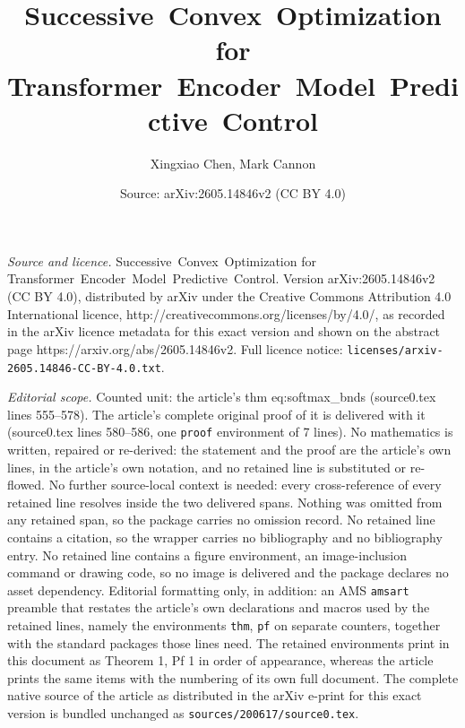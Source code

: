 \documentclass[10pt,a4paper]{amsart}
\title{Successive~Convex~Optimization for Transformer~Encoder~Model~Predictive~Control}
\author{Xingxiao Chen, Mark Cannon}
\date{Source: arXiv:2605.14846v2 (CC BY 4.0)}
\begin{document}
\maketitle

\noindent\emph{Source and licence.} Successive~Convex~Optimization for Transformer~Encoder~Model~Predictive~Control. Version arXiv:2605.14846v2 (CC BY 4.0), distributed by arXiv under the Creative Commons Attribution 4.0 International licence, http://creativecommons.org/licenses/by/4.0/, as recorded in the arXiv licence metadata for this exact version and shown on the abstract page https://arxiv.org/abs/2605.14846v2. Full licence notice: \texttt{licenses/arxiv-2605.14846-CC-BY-4.0.txt}.\par\smallskip

\noindent\textit{Editorial scope.} Counted unit: the article's thm eq:softmax\_bnds (source0.tex lines 555--578). The article's complete original proof of it is delivered with it (source0.tex lines 580--586, one \texttt{proof} environment of 7 lines). No mathematics is written, repaired or re-derived: the statement and the proof are the article's own lines, in the article's own notation, and no retained line is substituted or re-flowed.  No further source-local context is needed: every cross-reference of every retained line resolves inside the two delivered spans.  Nothing was omitted from any retained span, so the package carries no omission record.  No retained line contains a citation, so the wrapper carries no bibliography and no bibliography entry.  No retained line contains a figure environment, an image-inclusion command or drawing code, so no image is delivered and the package declares no asset dependency.  Editorial formatting only, in addition: an AMS \texttt{amsart} preamble that restates the article's own declarations and macros used by the retained lines, namely the environments \texttt{thm}, \texttt{pf} on separate counters, together with the standard packages those lines need.  The retained environments print in this document as Theorem 1, Pf 1 in order of appearance, whereas the article prints the same items with the numbering of its own full document.  The complete native source of the article as distributed in the arXiv e-print for this exact version is bundled unchanged as \texttt{sources/200617/source0.tex}.
\end{document}
